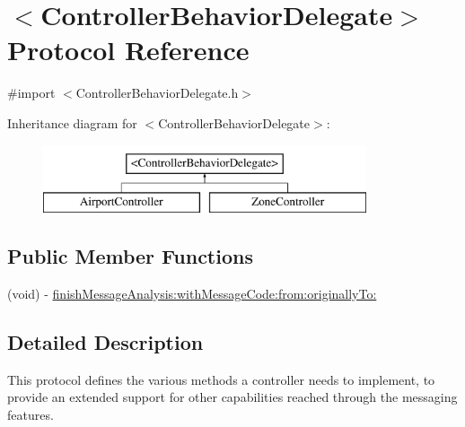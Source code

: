 \hypertarget{protocol_controller_behavior_delegate-p}{
\section{$<$\-Controller\-Behavior\-Delegate$>$ \-Protocol \-Reference}
\label{protocol_controller_behavior_delegate-p}
}


{\ttfamily \#import $<$\-Controller\-Behavior\-Delegate.\-h$>$}

\-Inheritance diagram for $<$\-Controller\-Behavior\-Delegate$>$\-:\begin{figure}[H]
\begin{center}
\leavevmode
\includegraphics[height=2.000000cm]{protocol_controller_behavior_delegate-p}
\end{center}
\end{figure}
\subsection*{\-Public \-Member \-Functions}
\begin{DoxyCompactItemize}
\item 
(void) -\/ \hyperlink{protocol_controller_behavior_delegate-p_a472f0aba04d2caffc0035e0356b2f85c}{finish\-Message\-Analysis\-:with\-Message\-Code\-:from\-:originally\-To\-:}
\end{DoxyCompactItemize}


\subsection{\-Detailed \-Description}
\-This protocol defines the various methods a controller needs to implement, to provide an extended support for other capabilities reached through the messaging features. 

